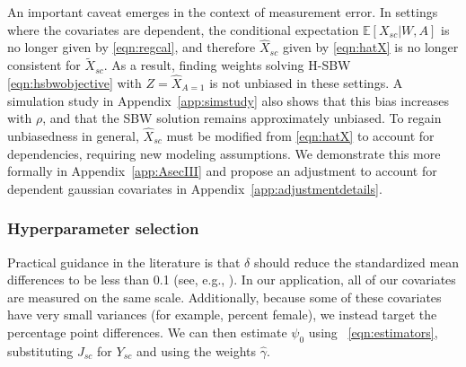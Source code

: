 \documentclass[aoas]{imsart}
\theoremstyle{plain}
\theoremstyle{remark}
\begin{document}
An important caveat emerges in the context of measurement error. In settings where the covariates are dependent, the conditional expectation $\mathbb{E}[X_{sc}|W,A]$ is no longer given by \eqref{eqn:regcal}, and therefore $\hat{X}_{sc}$ given by \eqref{eqn:hatX} is no longer consistent for $\tilde{X}_{sc}$. As a result, finding weights solving H-SBW \eqref{eqn:hsbwobjective} with $Z = \hat{X}_{A=1}$ is not unbiased in these settings. A simulation study in Appendix~\ref{app:simstudy} also shows that this bias increases with $\rho$, and that the SBW solution remains approximately unbiased. To regain unbiasedness in general, $\hat{X}_{sc}$ must be modified from \eqref{eqn:hatX} to account for dependencies, requiring new modeling assumptions. We demonstrate this more formally in Appendix~\ref{app:AsecIII} and propose an adjustment to account for dependent gaussian covariates in Appendix~\ref{app:adjustmentdetails}.

\subsubsection{Hyperparameter selection} \label{ssec:delta}

Practical guidance in the literature is that $\delta$ should reduce the standardized mean differences to be less than 0.1 (see, e.g., \cite{zhang2019balance}). In our application, all of our covariates are measured on the same scale. Additionally, because some of these covariates have very small variances (for example, percent female), we instead target the percentage point differences. We can then estimate $\psi_0$ using ~\eqref{eqn:estimators}, substituting $J_{sc}$ for $Y_{sc}$ and using the weights $\hat{\gamma}$.
\end{document}
